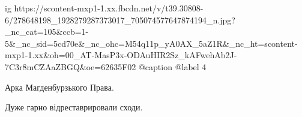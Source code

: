  
 
 
 
 

\ifcmt
  ig https://scontent-mxp1-1.xx.fbcdn.net/v/t39.30808-6/278648198_1928279287373017_705074577647874194_n.jpg?_nc_cat=105&ccb=1-5&_nc_sid=5cd70e&_nc_ohc=M54q11p_yA0AX_5aZ1R&_nc_ht=scontent-mxp1-1.xx&oh=00_AT-MasP3x-ODAuHIR2Sz_kAFwehAb2J-7C3r8mCZAaZBGQ&oe=62635F02
  @caption @label 4
\fi

Арка Магденбурзького Права.

Дуже гарно відреставрировали сходи.
